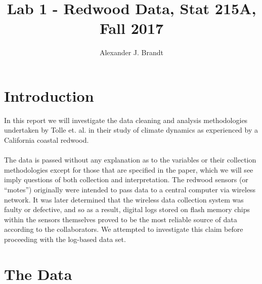 \documentclass[english]{article}\usepackage[]{graphicx}\usepackage[]{color}
\begin{document}
\title{Lab 1 - Redwood Data, Stat 215A, Fall 2017}


\author{Alexander J. Brandt}

\maketitle





\section{Introduction}

In this report we will investigate the data cleaning and analysis methodologies undertaken by Tolle et. al. in their study of climate dynamics as experienced by a California coastal redwood.\\\\
The data is passed without any explanation as to the variables or their collection
methodologies except for those that are specified in the paper, which we will see
imply questions of both collection and interpretation.  The redwood sensors (or ``motes'')
originally were intended to pass data to a central computer via wireless network.  It was
later determined that the wireless data collection system was faulty or defective, and
so as a result, digital logs stored on flash memory chips within the sensors themselves 
proved to be the most reliable source of data according to the collaborators.  We attempted
to investigate this claim before proceeding with the log-based data set.\\

\section{The Data}
\end{document}

